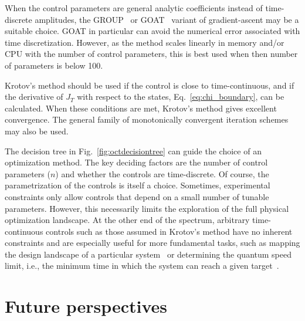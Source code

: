 \documentclass[submission, Phys]{SciPost}
\begin{document}
When the control parameters are general analytic coefficients instead of
time-discrete amplitudes, the GROUP~\cite{SkinnerJMR2010,
MotzoiPRA2011,SorensenPRA2018} or GOAT~\cite{MachnesPRL2018} variant of
gradient-ascent may be a suitable choice.
GOAT in particular can avoid the numerical error associated with time
discretization.
However, as the method scales linearly in memory and/or CPU with the number of
control parameters, this is best used when then number of parameters is below
100.

Krotov's method should be used if the control is close to time-continuous, and
if the derivative of \(J_T\) with respect to the states,
Eq.~\eqref{eq:chi_boundary}, can be calculated.
When these conditions are met, Krotov's method gives excellent convergence.
The general family of monotonically convergent iteration
schemes~\cite{MadayJCP2003} may also be used.


The decision tree in Fig.~\ref{fig:octdecisiontree} can guide the choice of an
optimization method.
The key deciding factors are the number of control parameters ($n$) and whether
the controls are time-discrete.
Of course, the parametrization of the controls is itself a choice.
Sometimes, experimental constraints only allow controls that depend on a small
number of tunable parameters.
However, this necessarily limits the exploration of the full physical
optimization landscape.
At the other end of the spectrum, arbitrary time-continuous controls such as
those assumed in Krotov's method have no inherent constraints and are especially
useful for more fundamental tasks, such as mapping the design landscape of a
particular system~\cite{GoerzNPJQI2017} or determining the quantum speed limit,
i.e., the minimum time in which the system can reach a given
target~\cite{CanevaPRL09,GoerzJPB11,SorensenNat16}.


\section{Future perspectives}%
\label{sec:future_perspectives}
\end{document}
